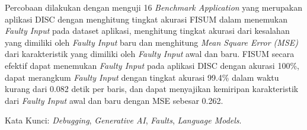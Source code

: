 Percobaan dilakukan dengan menguji 16 \textit{Benchmark Application} yang merupakan aplikasi DISC dengan menghitung tingkat akurasi FISUM dalam menemukan \textit{Faulty Input} pada dataset aplikasi, menghitung tingkat akurasi dari kesalahan yang dimiliki oleh \textit{Faulty Input} baru dan menghitung \textit{Mean Square Error (MSE)} dari karakteristik yang dimiliki oleh \textit{Faulty Input} awal dan baru. FISUM secara efektif dapat menemukan \textit{Faulty Input} pada aplikasi DISC dengan akurasi 100\%, dapat merangkum \textit{Faulty Input} dengan tingkat akurasi 99.4\% dalam waktu kurang dari 0.082 detik per baris, dan dapat menyajikan kemiripan karakteristik dari \textit{Faulty Input} awal dan baru dengan MSE sebesar 0.262.


Kata Kunci: \emph{Debugging}, \emph{Generative AI}, \emph{Faults}, \emph{Language Models}.
